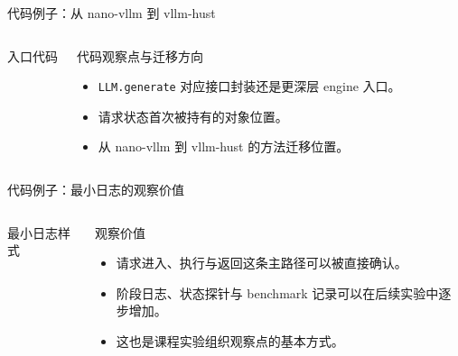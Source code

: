 \begin{frame}{代码例子：从 nano-vllm 到 vllm-hust}
  \begin{columns}[T,totalwidth=\textwidth]
    \begin{block}{入口代码}
      {\ttfamily\small
      \par
      \par
      \par
      }
    \end{block}
    \begin{block}{代码观察点与迁移方向}
      \begin{itemize}
        \item \texttt{LLM.generate} 对应接口封装还是更深层 engine 入口。
        \item 请求状态首次被持有的对象位置。
        \item 从 nano-vllm 到 vllm-hust 的方法迁移位置。
      \end{itemize}
    \end{block}
  \end{columns}
\end{frame}

\begin{frame}{代码例子：最小日志的观察价值}
  \begin{columns}[T,totalwidth=\textwidth]
    \begin{block}{最小日志样式}
      {\ttfamily\small
      \par
      \par
      }
    \end{block}
    \begin{block}{观察价值}
      \begin{itemize}
        \item 请求进入、执行与返回这条主路径可以被直接确认。
        \item 阶段日志、状态探针与 benchmark 记录可以在后续实验中逐步增加。
        \item 这也是课程实验组织观察点的基本方式。
      \end{itemize}
    \end{block}
  \end{columns}
\end{frame}

